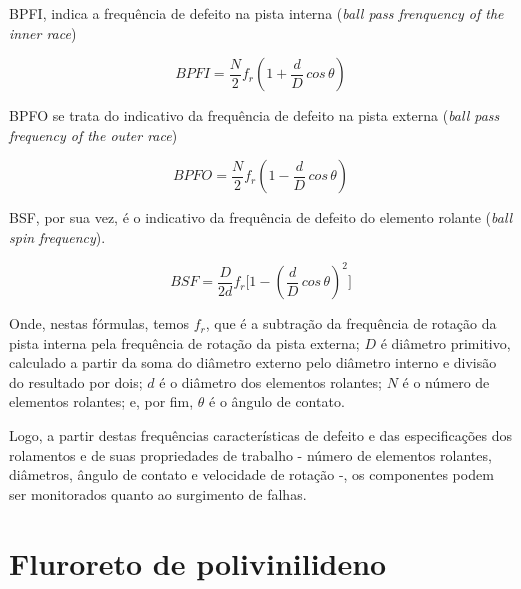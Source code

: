 \documentclass[
	12pt,				
	oneside,			
	a4paper,			
	english,			
	brazil,			
	]{abntex2ppgsi}
\begin{document}

BPFI, indica a frequência de defeito na pista interna (\textit{ball pass frenquency of the inner race})

\begin{equation}
	BPFI = \frac{N}{2}f_{r} \left ( 1 + \frac{d}{D} \,cos \, \theta \right ) 
	\label{eq: BPFI}
\end{equation}


BPFO se trata do indicativo da frequência de defeito na pista externa (\textit{ball pass frequency of the outer race})

\begin{equation}
	BPFO = \frac{N}{2}f_{r} \left ( 1 - \frac{d}{D} \,cos \, \theta \right )
	\label{eq: BPFO}
\end{equation}


BSF, por sua vez, é o indicativo da frequência de defeito do elemento rolante (\textit{ball spin frequency}).

\begin{equation}
	BSF = \frac{D}{2d}f_{r} \Bigg[  1 - \left ( \frac{d}{D} \,cos \, \theta \right ) ^{2}  \Bigg]
	\label{eq: BSF}
\end{equation}


Onde, nestas fórmulas, temos $f_{r}$, que é a subtração da frequência de rotação da pista interna pela frequência de rotação da pista externa; $D$ é diâmetro primitivo, calculado a partir da soma do diâmetro externo pelo diâmetro interno e divisão do resultado por dois; $d$ é o diâmetro dos elementos rolantes; $N$ é o número de elementos rolantes; e, por fim, $\theta$ é o ângulo de contato.

Logo, a partir destas frequências características de defeito e das especificações dos rolamentos e de suas propriedades de trabalho - número de elementos rolantes, diâmetros, ângulo de contato e velocidade de rotação -, os componentes podem ser monitorados quanto ao surgimento de falhas.  

\newpage
\section{\textbf{Fluroreto de polivinilideno}}
\end{document}
